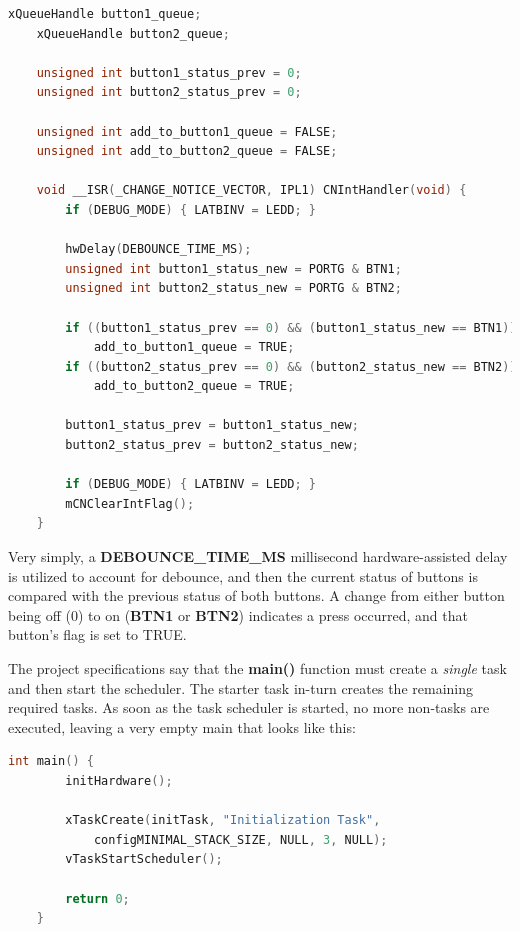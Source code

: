 \documentclass[a4paper, 12pt]{article}
\begin{document}
\begin{mdframed}[backgroundcolor=code-gray, roundcorner=10pt,
								innerleftmargin=5, innertopmargin=5, innerbottommargin=5]	
	\begin{lstlisting}[language=C, caption=Global Variables and CN ISR, tabsize=2, label={lst:init-hardware}]
	xQueueHandle button1_queue;
	xQueueHandle button2_queue; 

	unsigned int button1_status_prev = 0;
	unsigned int button2_status_prev = 0;

	unsigned int add_to_button1_queue = FALSE;
	unsigned int add_to_button2_queue = FALSE;
	
	void __ISR(_CHANGE_NOTICE_VECTOR, IPL1) CNIntHandler(void) {
		if (DEBUG_MODE) { LATBINV = LEDD; }
	
		hwDelay(DEBOUNCE_TIME_MS);
		unsigned int button1_status_new = PORTG & BTN1;
		unsigned int button2_status_new = PORTG & BTN2;

		if ((button1_status_prev == 0) && (button1_status_new == BTN1))
			add_to_button1_queue = TRUE;
		if ((button2_status_prev == 0) && (button2_status_new == BTN2))
			add_to_button2_queue = TRUE;

		button1_status_prev = button1_status_new;
		button2_status_prev = button2_status_new;

		if (DEBUG_MODE) { LATBINV = LEDD; }
		mCNClearIntFlag();
	}
	\end{lstlisting}
	\end{mdframed}
	
Very simply, a \textbf{DEBOUNCE\_TIME\_MS} millisecond hardware-assisted delay is utilized to account for debounce, and then the current status of buttons is compared with the previous status of both buttons. A change from either button being off (0) to on (\textbf{BTN1} or \textbf{BTN2}) indicates a press occurred, and that button's flag is set to TRUE.
	
The project specifications say that the \textbf{main()} function must create a \emph{single} task and then start the scheduler. The starter task in-turn creates the remaining required tasks. As soon as the task scheduler is started, no more non-tasks are executed, leaving a very empty main that looks like this:

	\begin{mdframed}[backgroundcolor=code-gray, roundcorner=10pt,
								innerleftmargin=5, innertopmargin=5, innerbottommargin=5]	
	\begin{lstlisting}[language=C, caption=Main Function, tabsize=2, label={lst:main}]
	int main() {
		initHardware();

		xTaskCreate(initTask, "Initialization Task",
			configMINIMAL_STACK_SIZE, NULL, 3, NULL);
		vTaskStartScheduler();

		return 0;
	}
	\end{lstlisting}
	\end{mdframed}
	
\end{document}
